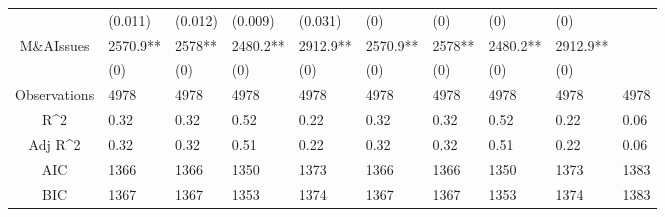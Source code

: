 \documentclass{article}
\begin{document}
\begin{table}[H]
\begin{tabular}{|clllllllll|}
   & (0.011) & (0.012) & (0.009) & (0.031) & (0) & (0) & (0) & (0) &  \\ 
  M\&AIssues & 2570.9** & 2578** & 2480.2** & 2912.9** & 2570.9** & 2578** & 2480.2** & 2912.9** &  \\ 
   & (0) & (0) & (0) & (0) & (0) & (0) & (0) & (0) &  \\ 
  \hline 
 Observations & 4978 & 4978 & 4978 & 4978 & 4978 & 4978 & 4978 & 4978 & 4978 \\ 
  R^2 & 0.32 & 0.32 & 0.52 & 0.22 & 0.32 & 0.32 & 0.52 & 0.22 & 0.06 \\ 
  Adj R^2 & 0.32 & 0.32 & 0.51 & 0.22 & 0.32 & 0.32 & 0.51 & 0.22 & 0.06 \\ 
  AIC & 1366 & 1366 & 1350 & 1373 & 1366 & 1366 & 1350 & 1373 & 1383 \\ 
  BIC & 1367 & 1367 & 1353 & 1374 & 1367 & 1367 & 1353 & 1374 & 1383 \\ 
   \hline
\end{tabular}
 
\end{table}
\end{document}
